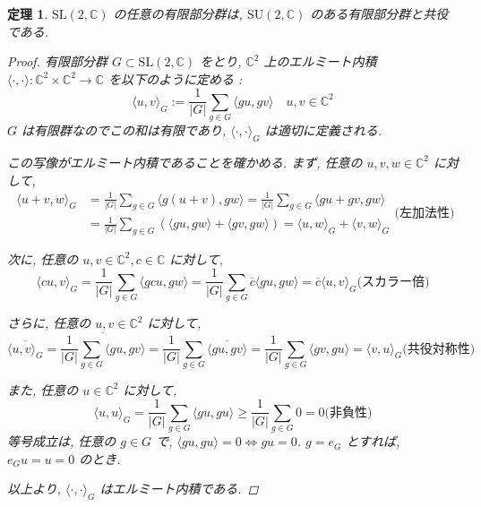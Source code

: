 \documentclass[xelatex,a4paper,ja=standard]{bxjsreport}
\newtheorem{theorem}[definition]{定理}%
\begin{document}
\begin{theorem}
    \(\mathrm{SL}(2, \mathbb{C})\) の任意の有限部分群は, \(\mathrm{SU}(2, \mathbb{C})\) のある有限部分群と共役である.

    \begin{proof}
        有限部分群 \(G \subset \mathrm{SL}(2, \mathbb{C})\) をとり, 
        \(\mathbb{C}^2\) 上のエルミート内積 \(\langle \cdot, \cdot \rangle : \mathbb{C}^2 \times \mathbb{C}^2 \rightarrow \mathbb{C}\)
        を以下のように定める :
        \[\langle u,v\rangle_G := \frac{1}{|G|} \sum_{g\in G}\langle gu,gv\rangle
        \quad u,v\in\mathbb{C}^2 \]
        \(G\) は有限群なのでこの和は有限であり, \(\langle\cdot,\cdot\rangle_G\) は適切に定義される.

        この写像がエルミート内積であることを確かめる.
        まず, 任意の \(u,v,w \in \mathbb{C}^2\) に対して,
        \[\begin{aligned} \langle u+v, w \rangle_G &= \frac{1}{|G|}\sum_{g\in G} \langle g(u+v), gw \rangle
        = \frac{1}{|G|}\sum_{g\in G} \langle gu + gv, gw \rangle \\
        &= \frac{1}{|G|}\sum_{g\in G} (\langle gu, gw \rangle + \langle gv, gw \rangle)
        = \langle u, w \rangle_G + \langle v, w \rangle_G \end{aligned} \text{(左加法性)}\]

        次に, 任意の \(u, v \in \mathbb{C}^2, c \in \mathbb{C}\) に対して,
        \[\langle cu, v \rangle_G = \frac{1}{|G|}\sum_{g\in G} \langle gcu, gw \rangle
            = \frac{1}{|G|}\sum_{g\in G} \overline{c} \langle gu, gw \rangle
            = \overline{c} \langle u,v\rangle_G \text{(スカラー倍)}\]

        さらに, 任意の \(u, v \in \mathbb{C}^2\) に対して,
        \[\overline{\langle u, v \rangle_G} = \overline{\frac{1}{|G|}\sum_{g\in G} \langle gu, gv\rangle}
            = \frac{1}{|G|}\sum_{g\in G} \overline{\langle gu, gv \rangle}
            = \frac{1}{|G|}\sum_{g\in G} \langle gv, gu \rangle
            = \langle v, u \rangle_G \text{(共役対称性)}\]

        また, 任意の \(u \in \mathbb{C}^2\) に対して,
        \[\langle u, u \rangle_G = \frac{1}{|G|}\sum_{g\in G} \langle gu, gu \rangle
            \ge \frac{1}{|G|}\sum_{g\in G} 0 = 0 \text{(非負性)}\]
        等号成立は, 任意の \(g \in G\) で, \(\langle gu, gu \rangle = 0 \Leftrightarrow gu = 0\). \(g = e_G\) とすれば, \(e_Gu = u = 0\) のとき.


        以上より, \(\langle \cdot, \cdot \rangle_G\) はエルミート内積である.
        

\end{proof}
\end{theorem}
\end{document}
